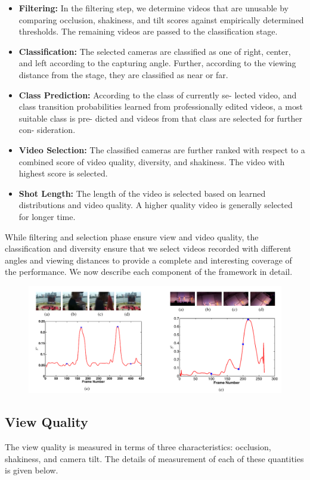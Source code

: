 \documentclass{sig-alternate}
\begin{document}
\begin{itemize}
    \item \textbf{Filtering:} In the filtering step, we determine videos that are
unusable by comparing occlusion, shakiness, and tilt scores
against empirically determined thresholds. The remaining
videos are passed to the classification stage.
    \item \textbf{Classification:} The selected cameras are classified as one
of right, center, and left according to the capturing angle.
Further, according to the viewing distance from the stage,
they are classified as near or far.
    \item \textbf{Class Prediction:} According to the class of currently se-
lected video, and class transition probabilities learned from
professionally edited videos, a most suitable class is pre-
dicted and videos from that class are selected for further con-
sideration.
    \item \textbf{Video Selection:} The classified cameras are further ranked
with respect to a combined score of video quality, diversity,
and shakiness. The video with highest score is selected.
    \item \textbf{Shot Length:} The length of the video is selected based on
learned distributions and video quality. A higher quality video
is generally selected for longer time.
\end{itemize}

While filtering and selection phase ensure view and video quality, the classification and diversity ensure that we select videos recorded with different angles and viewing distances to provide a
complete and interesting coverage of the performance. We now
describe each component of the framework in detail.
\begin{figure}{
\centering
\includegraphics{image4.pdf}}
\end{figure}
\subsection{View Quality}
The view quality is measured in terms of three characteristics:
occlusion, shakiness, and camera tilt. The details of measurement
of each of these quantities is given below.
\end{document}
